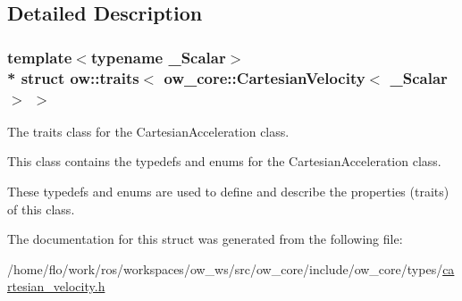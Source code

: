 \subsection{Detailed Description}
\subsubsection*{template$<$typename \+\_\+\+Scalar$>$\\*
struct ow\+::traits$<$ ow\+\_\+core\+::\+Cartesian\+Velocity$<$ \+\_\+\+Scalar $>$ $>$}

The traits class for the Cartesian\+Acceleration class. 

This class contains the typedefs and enums for the Cartesian\+Acceleration class.

These typedefs and enums are used to define and describe the properties (traits) of this class. 

The documentation for this struct was generated from the following file\+:\begin{DoxyCompactItemize}
\item 
/home/flo/work/ros/workspaces/ow\+\_\+ws/src/ow\+\_\+core/include/ow\+\_\+core/types/\hyperlink{cartesian__velocity_8h}{cartesian\+\_\+velocity.\+h}\end{DoxyCompactItemize}
